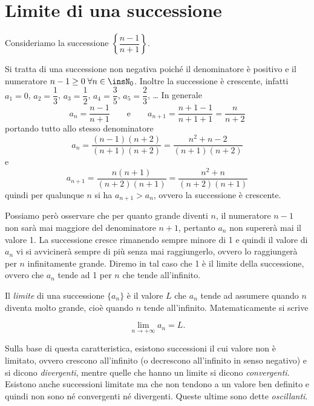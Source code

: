 \section{Limite di una successione}

Consideriamo la successione $\left\{\dfrac{n-1}{n+1}\right\}$.

Si tratta di una successione non negativa poiché il denominatore è positivo e il numeratore $n-1\ge0\;\forall n\in\insN_0$. Inoltre la successione è crescente, infatti $a_1=0$, $a_2=\dfrac{1}{3}$, $a_3=\dfrac{1}{2}$, $a_4=\dfrac{3}{5}$, $a_5=\dfrac{2}{3}$, \ldots{} In generale
\[a_n = \frac{n-1}{n+1}\qquad\text{e}\qquad a_{n+1} = \frac{n+1-1}{n+1+1}=\frac{n}{n+2}\]
portando tutto allo stesso denominatore
\[a_n=\frac{(n-1)(n+2)}{(n+1)(n+2)}=\frac{n^2+n-2}{(n+1)(n+2)}\]
e
\[a_{n+1}=\frac{n(n+1)}{(n+2)(n+1)}=\frac{n^2+n}{(n+2)(n+1)}\]
quindi per qualunque $n$ si ha $a_{n+1} > a_n$, ovvero la successione è crescente.

Possiamo però osservare che per quanto grande diventi $n$, il numeratore $n-1$ non sarà mai maggiore del denominatore $n+1$, pertanto $a_n$ non supererà mai il valore 1. La successione cresce rimanendo sempre minore di 1 e quindi il valore di $a_n$ vi si avvicinerà sempre di più senza mai raggiungerlo, ovvero lo raggiungerà per $n$ infinitamente grande. Diremo in tal caso che 1 è il limite della successione, ovvero che $a_n$ tende ad 1 per $n$ che tende all'infinito.

Il \emph{limite} di una successione $\{a_n\}$ è il valore $L$ che $a_n$ tende ad assumere quando $n$ diventa molto grande, cioè quando $n$ tende all'infinito. Matematicamente si scrive

\[\lim_{n\to+\infty} a_n = L.\]

Sulla base di questa caratteristica, esistono successioni il cui valore non è limitato, ovvero crescono all'infinito (o decrescono all'infinito in senso negativo) e si dicono \emph{divergenti}, mentre quelle che hanno un limite si dicono \emph{convergenti}. Esistono anche successioni limitate ma che non tendono a un valore ben definito e quindi non sono né convergenti né divergenti. Queste ultime sono dette \emph{oscillanti}.

